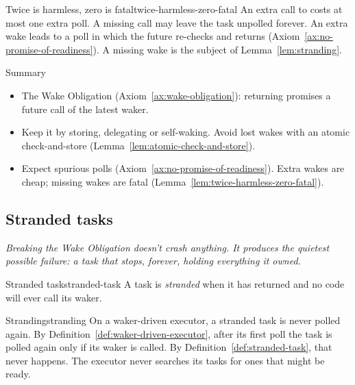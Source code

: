 \begin{lemma}{Twice is harmless, zero is fatal}{twice-harmless-zero-fatal}
    An extra call to  costs at most one extra poll. A missing call may leave the task unpolled forever.
    \why An extra wake leads to a poll in which the future re-checks and returns  (Axiom~\ref{ax:no-promise-of-readiness}). A missing wake is the subject of Lemma~\ref{lem:stranding}.
\end{lemma}

\begin{quotebox}{Summary}
    \begin{itemize}
        \item The Wake Obligation (Axiom~\ref{ax:wake-obligation}): returning  promises a future call of the latest waker.
        \item Keep it by storing, delegating or self-waking. Avoid lost wakes with an atomic check-and-store (Lemma~\ref{lem:atomic-check-and-store}).
        \item Expect spurious polls (Axiom~\ref{ax:no-promise-of-readiness}). Extra wakes are cheap; missing wakes are fatal (Lemma~\ref{lem:twice-harmless-zero-fatal}).
    \end{itemize}
\end{quotebox}

\subsection{Stranded tasks}
\label{sec:wakers-ch8}

\textit{Breaking the Wake Obligation doesn't crash anything. It produces the quietest possible failure: a task that stops, forever, holding everything it owned.}

\begin{definition}{Stranded task}{stranded-task}
    A task is \emph{stranded} when it has returned  and no code will ever call its waker.
\end{definition}

\begin{lemma}{Stranding}{stranding}
    On a waker-driven executor, a stranded task is never polled again.
    \why By Definition~\ref{def:waker-driven-executor}, after its first poll the task is polled again only if its waker is called. By Definition~\ref{def:stranded-task}, that never happens. The executor never searches its tasks for ones that might be ready.
\end{lemma}

